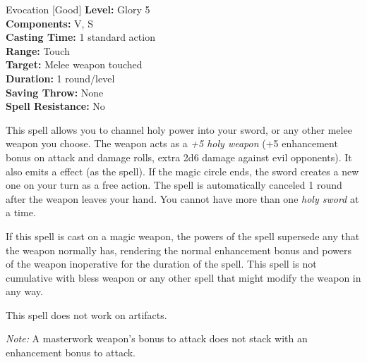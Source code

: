{Evocation [Good]}
{
	\textbf{Level:}
	Glory 5\\
	\textbf{Components:}
	V, S\\
	\textbf{Casting Time:}
	1 standard action\\
	\textbf{Range:}
	Touch\\
	\textbf{Target:}
	Melee weapon touched\\
	\textbf{Duration:}
	1 round/level\\
	\textbf{Saving Throw:}
	None\\
	\textbf{Spell Resistance:}
	No\\
}
{
	This spell allows you to channel holy power into your sword, or any other melee weapon you choose. The weapon acts as a \emph{+5 holy weapon} (+5 enhancement bonus on attack and damage rolls, extra 2d6 damage against evil opponents). It also emits a  effect (as the spell). If the magic circle ends, the sword creates a new one on your turn as a free action. The spell is automatically canceled 1 round after the weapon leaves your hand. You cannot have more than one \emph{holy sword} at a time.

	If this spell is cast on a magic weapon, the powers of the spell supersede any that the weapon normally has, rendering the normal enhancement bonus and powers of the weapon inoperative for the duration of the spell. This spell is not cumulative with bless weapon or any other spell that might modify the weapon in any way.

	This spell does not work on artifacts.

	\textit{Note:} A masterwork weapon's bonus to attack does not stack with an enhancement bonus to attack.

}
